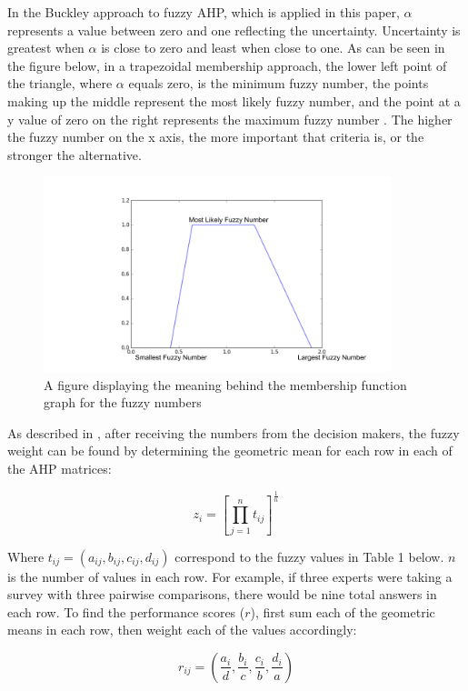  In the Buckley approach to fuzzy AHP, which is applied in this paper, $\alpha$ represents a value between zero and one reflecting the uncertainty.  Uncertainty is greatest when $\alpha$ is close to zero and least when close to one. As can be seen in the figure below, in a trapezoidal membership approach, the lower left point of the triangle, where $\alpha$ equals zero, is the minimum fuzzy number, the points making up the middle represent the most likely fuzzy number, and the point at a y value of zero on the right represents the maximum fuzzy number \cite{Pan2008}. The higher the fuzzy number on the x axis, the more important that criteria is, or the stronger the alternative.
\begin{figure}[h!]
  \centering
  \includegraphics[width=0.9\textwidth]{Fuzzy_explaination.png}
   \caption{A figure displaying the meaning behind the membership function graph for the fuzzy numbers}
\end{figure}

 As described in \cite{Kahraman2010}, after receiving the numbers from the decision makers, the fuzzy weight can be found by determining the geometric mean for each row in each of the AHP matrices:

 \begin{equation}
 z_i=[\prod_{j=1}^n t_{ij}]^{\frac{1}{n}}
 \end{equation}

 Where $t_{ij}=(a_{ij},b_{ij}, c_{ij}, d_{ij})$ correspond to the fuzzy values in Table 1 below. $n$ is the number of values in each row.  For example, if three experts were taking a survey with three pairwise comparisons, there would be nine total answers in each row. To find the performance scores ($r$), first sum each of the geometric means in each row, then weight each of the values accordingly:

\begin{equation}
r_{ij}=(\frac{a_i}{d},\frac{b_i}{c},\frac{c_i}{b},\frac{d_i}{a})
\end{equation}

